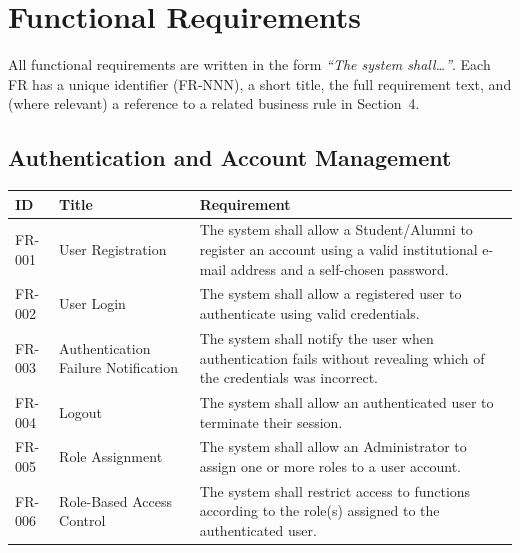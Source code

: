 \documentclass[11pt,a4paper]{article}
\begin{document}
\section{Functional Requirements}
All functional requirements are written in the form \emph{``The system
shall\ldots''}. Each FR has a unique identifier (FR-NNN), a short title,
the full requirement text, and (where relevant) a reference to a related
business rule in Section~4.

\subsection{Authentication and Account Management}
\begin{tabularx}{\textwidth}{@{}p{1.6cm} p{4.0cm} Y@{}}
\caption{Functional requirements -- Authentication and Account Management.}
\label{tab:fr-auth}
\toprule
\textbf{ID} & \textbf{Title} & \textbf{Requirement} \\
\midrule
FR-001 & User Registration &
  The system shall allow a Student/Alumni to register an account using a valid institutional e-mail address and a self-chosen password. \\
FR-002 & User Login &
  The system shall allow a registered user to authenticate using valid credentials. \\
FR-003 & Authentication Failure Notification &
  The system shall notify the user when authentication fails without revealing which of the credentials was incorrect. \\
FR-004 & Logout &
  The system shall allow an authenticated user to terminate their session. \\
FR-005 & Role Assignment &
  The system shall allow an Administrator to assign one or more roles to a user account. \\
FR-006 & Role-Based Access Control &
  The system shall restrict access to functions according to the role(s) assigned to the authenticated user. \\
\bottomrule
\end{tabularx}
\end{document}
